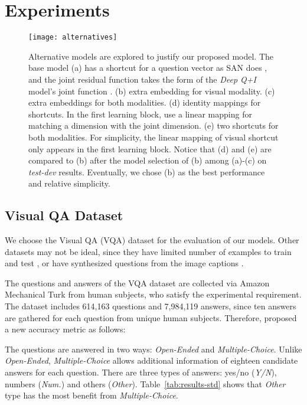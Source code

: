 \documentclass{article}
\begin{document}
\section{Experiments}
\label{sec:experiments}

\begin{figure}[t]
\centering
\texttt{[image: alternatives]}
\caption{Alternative models are explored to justify our proposed model. The base model (a) has a shortcut for a question vector as SAN does \cite{Yang2015}, and the joint residual function takes the form of the \textit{Deep Q+I} model's joint function \cite{Lu2015}. (b) extra embedding for visual modality. (c) extra embeddings for both modalities. (d) identity mappings for shortcuts. In the first learning block, use a linear mapping for matching a dimension with the joint dimension. (e) two shortcuts for both modalities. For simplicity, the linear mapping of visual shortcut only appears in the first learning block. Notice that (d) and (e) are compared to (b) after the model selection of (b) among (a)-(c) on \textit{test-dev} results. Eventually, we chose (b) as the best performance and relative simplicity.}
\label{fig:alternatives}
\end{figure}

\subsection{Visual QA Dataset}


We choose the Visual QA (VQA) dataset \cite{Antol2015} for the evaluation of our models. Other datasets may not be ideal, since they have limited number of examples to train and test \cite{Malinowski2015}, or have synthesized questions from the image captions \cite{Lin2014,Ren2015}.

The questions and answers of the VQA dataset are collected via Amazon Mechanical Turk from human subjects, who satisfy the experimental requirement. The dataset includes 614,163 questions and 7,984,119 answers, since ten answers are gathered for each question from unique human subjects. Therefore, \citet{Antol2015} proposed a new accuracy metric as follows:  

The questions are answered in two ways: \textit{Open-Ended} and \textit{Multiple-Choice}. Unlike \textit{Open-Ended}, \textit{Multiple-Choice} allows additional information of eighteen candidate answers for each question. There are three types of answers: yes/no (\textit{Y/N}), numbers (\textit{Num.}) and others (\textit{Other}). Table~\ref{tab:results-std} shows that \textit{Other} type has the most benefit from \textit{Multiple-Choice}.
\end{document}
